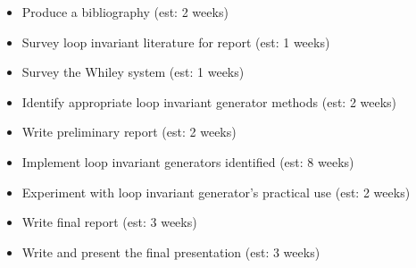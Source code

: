 \documentclass[11pt, a4paper, twoside, openright]{report}
\begin{document}
\begin{itemize}
    \item Produce a bibliography (est: 2 weeks) 
    \item Survey loop invariant literature for report (est: 1 weeks) 
    \item Survey the Whiley system (est: 1 weeks)
    \item Identify appropriate loop invariant generator methods (est: 2 weeks)
    \item Write preliminary report (est: 2 weeks)
    \item Implement loop invariant generators identified (est: 8 weeks)
    \item Experiment with loop invariant generator's practical use (est: 2 weeks)
    \item Write final report (est: 3 weeks)
    \item Write and present the final presentation (est: 3 weeks)
\end{itemize}

%
%
%
%
\end{document}

